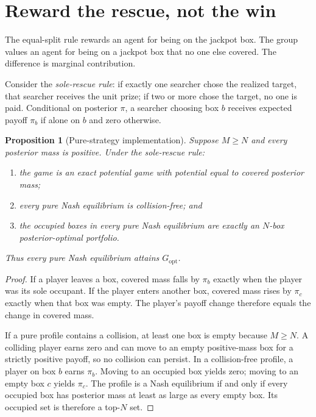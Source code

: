 \documentclass[11pt]{article}
\newtheorem{proposition}{Proposition}
\theoremstyle{definition}
\theoremstyle{remark}
\newcommand{\1}{\mathbf{1}}
\newcommand{\opt}{\mathrm{opt}}
\begin{document}
\section{Reward the rescue, not the win}
\label{sec:mechanism}

The equal-split rule rewards an agent for being on the jackpot box. The group values an agent for being on a jackpot box that no one else covered. The difference is marginal contribution.

Consider the \emph{sole-rescue rule}: if exactly one searcher chose the realized target, that searcher receives the unit prize; if two or more chose the target, no one is paid. Conditional on posterior $\pi$, a searcher choosing box $b$ receives expected payoff $\pi_b$ if alone on $b$ and zero otherwise.

\begin{proposition}[Pure-strategy implementation]
Suppose $M\ge N$ and every posterior mass is positive. Under the sole-rescue rule:
\begin{enumerate}[label=(\roman*)]
\item the game is an exact potential game with potential equal to covered posterior mass;
\item every pure Nash equilibrium is collision-free; and
\item the occupied boxes in every pure Nash equilibrium are exactly an $N$-box posterior-optimal portfolio.
\end{enumerate}
Thus every pure Nash equilibrium attains $G_{\opt}$.
\end{proposition}

\begin{proof}
If a player leaves a box, covered mass falls by $\pi_b$ exactly when the player was its sole occupant. If the player enters another box, covered mass rises by $\pi_c$ exactly when that box was empty. The player's payoff change therefore equals the change in covered mass.

If a pure profile contains a collision, at least one box is empty because $M\ge N$. A colliding player earns zero and can move to an empty positive-mass box for a strictly positive payoff, so no collision can persist. In a collision-free profile, a player on box $b$ earns $\pi_b$. Moving to an occupied box yields zero; moving to an empty box $c$ yields $\pi_c$. The profile is a Nash equilibrium if and only if every occupied box has posterior mass at least as large as every empty box. Its occupied set is therefore a top-$N$ set.
\end{proof}
\end{document}
